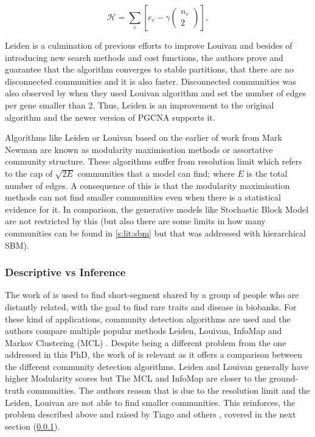 \begin{equation} \label{eq:CPM}
    {\mathcal H} ={\sum }_{c}[{e}_{c}-\gamma (\begin{array}{c}{n}_{c}\\ 2\end{array})],
\end{equation}

Leiden is a culmination of previous efforts to improve Louivan\cite{Ozaki2016-dl,Waltman2013-zw,Bae2017-rz, Traag2015-tq} and besides of introducing new search methods and cost functions, the authors prove and guarantee that the algorithm converges to stable partitions, that there are no disconnected communities and it is also faster. Disconnected communities was also observed by \citet{Care2019-ij} when they used Louivan algorithm and set the number of edges per gene smaller than 2. Thus, Leiden is an improvement to the original algorithm and the newer version of PGCNA \cite{Care2019-ij} supports it.

Algorithms like Leiden or Louivan based on the earlier of work from Mark Newman \cite{Newman2004-dd, Newman2006-fa} are known as modularity maximisation methods or assortative community structure. These algorithms suffer from resolution limit\cite{Fortunato2007-gh, Peixoto2021-jx} which refers to the cap of $\sqrt{2E}$ communities that a model can find; where $E$ is the total number of edges. A consequence of this is that the modularity maximisation methods can not find smaller communities even when there is a statistical evidence for it. In comparison, the generative models like Stochastic Block Model are not restricted by this (but also there are some limits in how many communities can be found in \cref{s:lit:sbm} but that was addressed with hierarchical SBM).

\subsubsection{Descriptive vs Inference} \label{s:lit:descriptive_inference}

The work of \citet{Shemirani2023-ww} is used to find short-segment shared by a group of people who are distantly related, with the goal to find rare traits and disease in biobanks. For these kind of applications, community detection algorithms are used and the authors compare multiple popular methods Leiden, Louivan, InfoMap \citet{Rosvall2008-kw} and Markov Clustering (MCL) \citet{Van_Dongen2008-yj}. Despite being a different problem from the one addressed in this PhD, the work of \citet{Shemirani2023-ww} is relevant as it offers a comparison between the different community detection algorithms. Leiden and Louivan generally have higher Modularity scores but The MCL and InfoMap are closer to the ground-truth communities. The authors reason that is due to the resolution limit and the Leiden, Louivan are not able to find smaller communities. This reinforces, the problem described above and raised by Tiago \citet{Peixoto2021-jx} and others \cite{Fortunato2007-gh, Traag2019-ne}, covered in the next section (\cref{s:lit:descriptive_inference}).

